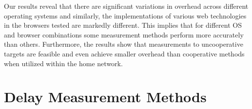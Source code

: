 \documentclass[12pt,twoside]{book}
\begin{document}

Our results reveal that there are significant variations in overhead across different operating systems and similarly, the implementations of various web technologies in the browsers tested are markedly different. This implies that for different OS and browser combinations some measurement methods perform more accurately than others. Furthermore, the results show that measurements to uncooperative targets are feasible and even achieve smaller overhead than cooperative methods when utilized within the home network.


\section{Delay Measurement Methods}
\label{sec:methods}
\end{document}
